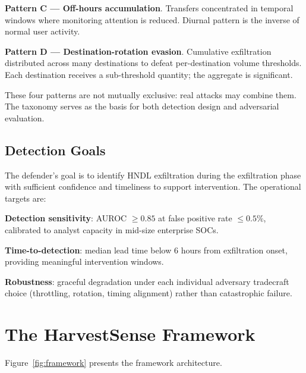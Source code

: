 \documentclass[sigconf,nonacm]{acmart}
\begin{document}
\textbf{Pattern C --- Off-hours accumulation}. Transfers concentrated
in temporal windows where monitoring attention is reduced. Diurnal
pattern is the inverse of normal user activity.

\textbf{Pattern D --- Destination-rotation evasion}. Cumulative
exfiltration distributed across many destinations to defeat
per-destination volume thresholds. Each destination receives a
sub-threshold quantity; the aggregate is significant.

These four patterns are not mutually exclusive: real attacks may
combine them. The taxonomy serves as the basis for both detection
design and adversarial evaluation.

\subsection{Detection Goals}

The defender's goal is to identify HNDL exfiltration during the
exfiltration phase with sufficient confidence and timeliness to
support intervention. The operational targets are:

\textbf{Detection sensitivity}: AUROC $\geq 0.85$ at false positive
rate $\leq 0.5\%$, calibrated to analyst capacity in mid-size
enterprise SOCs.

\textbf{Time-to-detection}: median lead time below 6 hours from
exfiltration onset, providing meaningful intervention windows.

\textbf{Robustness}: graceful degradation under each individual
adversary tradecraft choice (throttling, rotation, timing alignment)
rather than catastrophic failure.

\section{The HarvestSense Framework}

Figure~\ref{fig:framework} presents the framework architecture.
\end{document}
